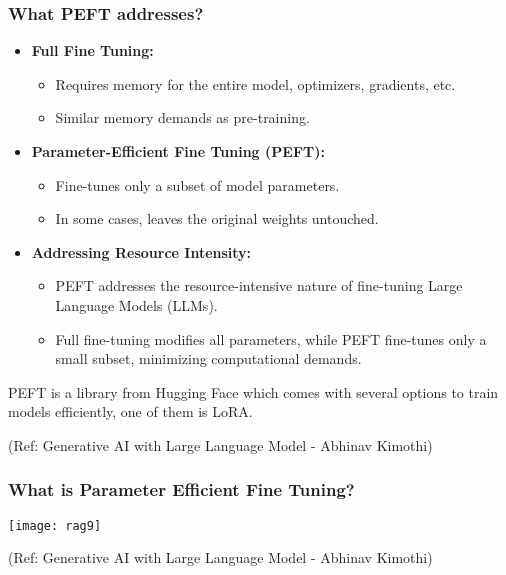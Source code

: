   


\begin{frame}[fragile]\frametitle{What PEFT addresses?}

\begin{itemize}
  \item \textbf{Full Fine Tuning:}
    \begin{itemize}
      \item Requires memory for the entire model, optimizers, gradients, etc.
      \item Similar memory demands as pre-training.
    \end{itemize}

  \item \textbf{Parameter-Efficient Fine Tuning (PEFT):}
    \begin{itemize}
      \item Fine-tunes only a subset of model parameters.
      \item In some cases, leaves the original weights untouched.
    \end{itemize}
	
    \item \textbf{Addressing Resource Intensity:}
      \begin{itemize}
        \item PEFT addresses the resource-intensive nature of fine-tuning Large Language Models (LLMs).
        \item Full fine-tuning modifies all parameters, while PEFT fine-tunes only a small subset, minimizing computational demands.
      \end{itemize}	
\end{itemize}

PEFT is a library from Hugging Face which comes with several options to train models efficiently, one of them is LoRA.

{\tiny (Ref: Generative AI with Large Language Model - Abhinav  Kimothi)}

\end{frame}


\begin{frame}[fragile]\frametitle{What is Parameter Efficient Fine Tuning?}


		\begin{center}
		\texttt{[image: rag9]}
		\end{center}

{\tiny (Ref: Generative AI with Large Language Model - Abhinav  Kimothi)}

\end{frame}




